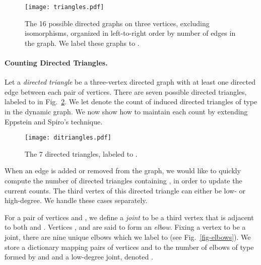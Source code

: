 \documentclass[11pt]{article}
\renewcommand{\subsection}[1]{\paragraph{\textbf{#1}.}}
\begin{document}
\begin{figure}[hb!]
\vspace{-24pt}
\begin{center}
\texttt{[image: triangles.pdf]}
\end{center}
\vspace{-24pt}
\caption{The 16 possible directed graphs on three vertices, excluding 
isomorphisms, organized in left-to-right order by number of edges in the graph. We
label these graphs  to .}
\label{fig-triangles}
\vspace{-18pt}
\end{figure}

\subsection{Counting Directed Triangles}

Let a \emph{directed triangle} be a three-vertex directed graph 
with at least one directed edge between each pair of vertices. There
are seven possible directed triangles, labeled  to  in 
Fig.~\ref{fig-ditriangles}. We let  denote the count of induced directed 
triangles of type  in the dynamic graph. We now show how to maintain  
each count  by extending Eppstein and Spiro's technique.
\begin{figure}[hb!]
\vspace{-24pt}
\begin{center}
\texttt{[image: ditriangles.pdf]}
\end{center}
\vspace{-24pt}
\caption{The 7 directed triangles, labeled  to .}
\label{fig-ditriangles}
\vspace{-12pt}
\end{figure}

\ifFull
When an edge  is added or removed from the graph, we would like 
to quickly compute the number of directed triangles containing ,
in order to update the current counts. The third vertex of this
directed triangle can either be low- or high-degree. We handle these
cases separately.\fi

For a pair of vertices  and , we define a \emph{joint} to 
be a third vertex  that is adjacent to both  and . Vertices , 
 and  are said to form an \emph{elbow}. Fixing a vertex to be a joint, 
there are nine unique elbows which we label  to 
(see Fig.~\ref{fig-elbows}). We store a dictionary mapping pairs of 
vertices  and  to the number of elbows of type  formed by  and  and a 
low-degree joint, denoted . 
\end{document}

